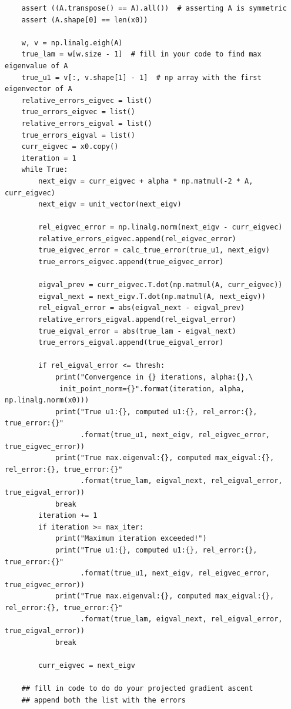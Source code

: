 \documentclass[12pt,twoside]{article}
\begin{document}
\begin{enumerate}
\begin{enumerate}
\begin{verbatim}
    assert ((A.transpose() == A).all())  # asserting A is symmetric
    assert (A.shape[0] == len(x0))

    w, v = np.linalg.eigh(A)
    true_lam = w[w.size - 1]  # fill in your code to find max eigenvalue of A
    true_u1 = v[:, v.shape[1] - 1]  # np array with the first eigenvector of A
    relative_errors_eigvec = list()
    true_errors_eigvec = list()
    relative_errors_eigval = list()
    true_errors_eigval = list()
    curr_eigvec = x0.copy()
    iteration = 1
    while True:
        next_eigv = curr_eigvec + alpha * np.matmul(-2 * A, curr_eigvec)
        next_eigv = unit_vector(next_eigv)

        rel_eigvec_error = np.linalg.norm(next_eigv - curr_eigvec)
        relative_errors_eigvec.append(rel_eigvec_error)
        true_eigvec_error = calc_true_error(true_u1, next_eigv)
        true_errors_eigvec.append(true_eigvec_error)

        eigval_prev = curr_eigvec.T.dot(np.matmul(A, curr_eigvec))
        eigval_next = next_eigv.T.dot(np.matmul(A, next_eigv))
        rel_eigval_error = abs(eigval_next - eigval_prev)
        relative_errors_eigval.append(rel_eigval_error)
        true_eigval_error = abs(true_lam - eigval_next)
        true_errors_eigval.append(true_eigval_error)

        if rel_eigval_error <= thresh:
            print("Convergence in {} iterations, alpha:{},\
             init_point_norm={}".format(iteration, alpha, np.linalg.norm(x0)))
            print("True u1:{}, computed u1:{}, rel_error:{}, true_error:{}"
                  .format(true_u1, next_eigv, rel_eigvec_error, true_eigvec_error))
            print("True max.eigenval:{}, computed max_eigval:{}, rel_error:{}, true_error:{}"
                  .format(true_lam, eigval_next, rel_eigval_error, true_eigval_error))
            break
        iteration += 1
        if iteration >= max_iter:
            print("Maximum iteration exceeded!")
            print("True u1:{}, computed u1:{}, rel_error:{}, true_error:{}"
                  .format(true_u1, next_eigv, rel_eigvec_error, true_eigvec_error))
            print("True max.eigenval:{}, computed max_eigval:{}, rel_error:{}, true_error:{}"
                  .format(true_lam, eigval_next, rel_eigval_error, true_eigval_error))
            break

        curr_eigvec = next_eigv

    ## fill in code to do do your projected gradient ascent
    ## append both the list with the errors


\end{verbatim}
\end{enumerate}
\end{enumerate}
\end{document}
